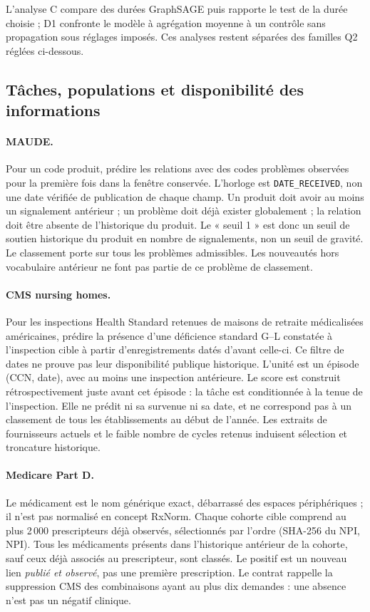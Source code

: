 L'analyse C compare des durées GraphSAGE puis rapporte le test de la durée choisie ; D1 confronte le modèle à agrégation moyenne à un contrôle sans propagation sous réglages imposés. Ces analyses restent séparées des familles Q2 réglées ci-dessous.

\subsection{Tâches, populations et disponibilité des informations}
\label{sec:tasks}

\paragraph{MAUDE.} Pour un code produit, prédire les relations avec des codes problèmes observées pour la première fois dans la fenêtre conservée. L'horloge est \texttt{DATE\_RECEIVED}, non une date vérifiée de publication de chaque champ. Un produit doit avoir au moins un signalement antérieur ; un problème doit déjà exister globalement ; la relation doit être absente de l'historique du produit. Le « seuil 1 » est donc un seuil de soutien historique du produit en nombre de signalements, non un seuil de gravité. Le classement porte sur tous les problèmes admissibles. Les nouveautés hors vocabulaire antérieur ne font pas partie de ce problème de classement\cite{hgbcontract,hgbcode}.

\paragraph{CMS nursing homes.} Pour les inspections Health Standard retenues de maisons de retraite médicalisées américaines, prédire la présence d'une déficience standard G--L constatée à l'inspection cible à partir d'enregistrements datés d'avant celle-ci. Ce filtre de dates ne prouve pas leur disponibilité publique historique. L'unité est un épisode (CCN, date), avec au moins une inspection antérieure. Le score est construit rétrospectivement juste avant cet épisode : la tâche est conditionnée à la tenue de l'inspection. Elle ne prédit ni sa survenue ni sa date, et ne correspond pas à un classement de tous les établissements au début de l'année. Les extraits de fournisseurs actuels et le faible nombre de cycles retenus induisent sélection et troncature historique\cite{cmsnursing,hgbcontract,hgbcode}.

\paragraph{Medicare Part D.} Le médicament est le nom générique exact, débarrassé des espaces périphériques ; il n'est pas normalisé en concept RxNorm. Chaque cohorte cible comprend au plus 2\,000 prescripteurs déjà observés, sélectionnés par l'ordre (SHA-256 du NPI, NPI). Tous les médicaments présents dans l'historique antérieur de la cohorte, sauf ceux déjà associés au prescripteur, sont classés. Le positif est un nouveau lien \emph{publié et observé}, pas une première prescription. Le contrat rappelle la suppression CMS des combinaisons ayant au plus dix demandes : une absence n'est pas un négatif clinique\cite{cmspartd,hgbpartd}.


